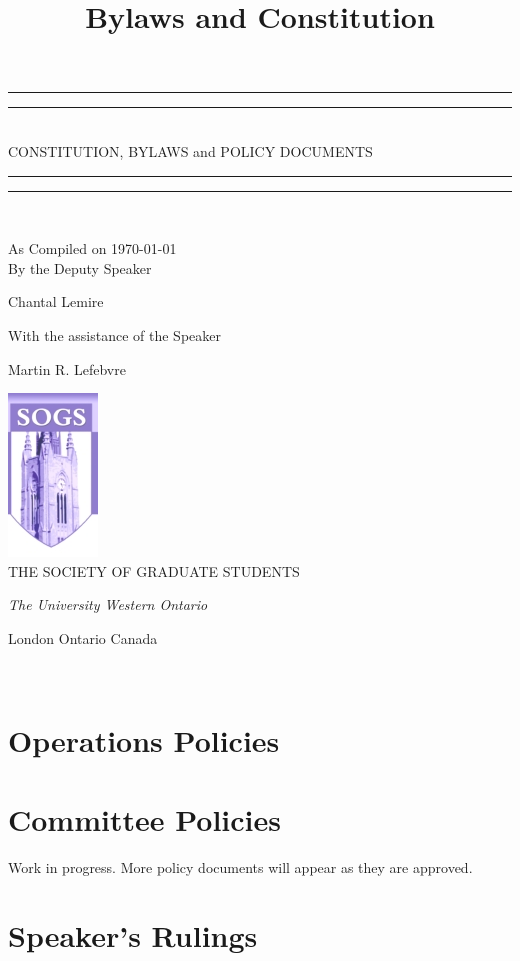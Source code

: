 \documentclass[12pt,letterpaper,oneside]{book}
\title{Bylaws and Constitution}
\newcommand*{\titleGP}{\begingroup %
\centering %
\vspace*{\baselineskip} %

\rule{\textwidth}{1.6pt}\vspace*{-\baselineskip}\vspace*{2pt} %
\rule{\textwidth}{0.4pt}\\[\baselineskip] %

{\LARGE CONSTITUTION, BYLAWS} 
and
{\LARGE POLICY DOCUMENTS}

\rule{\textwidth}{0.4pt}\vspace*{-\baselineskip}\vspace{3.2pt} %
\rule{\textwidth}{1.6pt}\\[\baselineskip] %



\vspace*{2\baselineskip} %

As Compiled on \today \\[\baselineskip]
By the Deputy Speaker

{\Large Chantal Lemire \par} %
\vspace*{\baselineskip} %
With the assistance of the Speaker \\[\baselineskip]
{\large Martin R. Lefebvre \par}


\vfill %

\includegraphics{logo.jpg}\\[1cm]


{\large THE SOCIETY OF GRADUATE STUDENTS}\par %
\scshape %
{\itshape The University Western Ontario\par} %
London Ontario Canada\par %
\the\year \\[0.3\baselineskip] %
\endgroup}
\begin{document}
 

\pagestyle{empty} %

\titleGP %

\tableofcontents %
\pagebreak %
\pagestyle{plain}






%

%
%



\chapter{Operations Policies}

 
 
 
 

\chapter{Committee Policies}
Work in progress. More policy documents will appear as they are approved.
% 


% 
 
 
 

\chapter{Speaker's Rulings}



\newpage
 
%
\printindex
\end{document}
